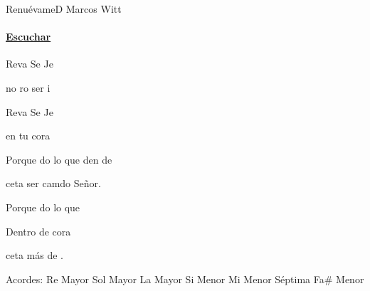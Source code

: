 \documentclass[12pt, spanish]{book}
\begin{document}
    \begin{song}{Renuévame}{D}
    {} %
    {Marcos Witt}
    {} %
    {}
        \ifChordBk
        \paragraph{\mbox{}\hfill\protect\href{https://open.spotify.com/intl-es/track/0XUwyz1NfrKue4iVrfm7aP}{Escuchar}\mbox{}\hfill}
        \fi

        \begin{SBOpGroup}
            Reva Se Je

             no ro ser i

            Reva Se Je

             en  tu cora
        \end{SBOpGroup}

        \begin{SBChorus}
            Porque do lo que  den de 

            ceta ser camdo Señor.

            Porque do lo que 

            Dentro de  cora

            ceta más de .
        \end{SBChorus}

        \ifChordBk
        \begin{SBOpGroup}
            Acordes:
            \upchord{\D}\qquad Re Mayor \hfill
            \upchord{\G}\qquad Sol Mayor \hfill\null\break
            \upchord{\A}\qquad La Mayor \hfill
            \upchord{\Bm}\qquad Si Menor \hfill\null\break
            \upchord{\Emseven}\qquad Mi Menor S\'eptima \hfill
            \upchord{\Fsm}\qquad Fa\# Menor \hfill\null\break
        \end{SBOpGroup}
        \fi
    \end{song}
\end{document}
